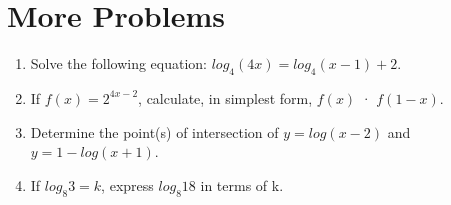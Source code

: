 \documentclass[12pt]{extarticle}
\begin{document}
\section{More Problems}
\begin{enumerate}
    \itemsep 2.5em
    \item {Solve the following equation: $log_4 (4x) = log_4 (x - 1) + 2.$} %
    \item {If $f(x) = 2^{4x-2}$, calculate, in simplest form, $f(x)$ · $f(1 - x)$.} %
    \item {Determine the point(s) of intersection of $y = log(x - 2)$ and $y = 1 - log(x + 1)$.} %
    \item {If $log_8 3 = k$, express $log_8 18$ in terms of k.} %
\end{enumerate}
\end{document}
